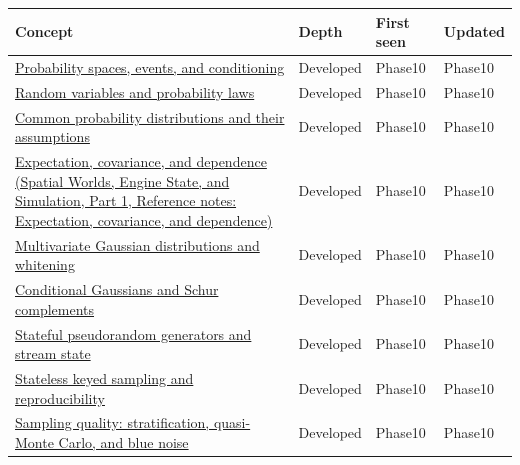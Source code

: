 {\def\LTcaptype{none} %
\begin{longtable}[]{@{}
  >{\raggedright\arraybackslash}p{}
  >{\raggedright\arraybackslash}p{}
  >{\raggedright\arraybackslash}p{}
  >{\raggedright\arraybackslash}p{}@{}}
\toprule\noalign{}
\begin{minipage}[b]{\linewidth}\raggedright
Concept
\end{minipage} & \begin{minipage}[b]{\linewidth}\raggedright
Depth
\end{minipage} & \begin{minipage}[b]{\linewidth}\raggedright
First seen
\end{minipage} & \begin{minipage}[b]{\linewidth}\raggedright
Updated
\end{minipage} \\
\midrule\noalign{}
\endhead
\bottomrule\noalign{}
\endlastfoot
\hyperref[appendix-f1ef323f6ed7]{Probability spaces, events, and conditioning} & Developed & Phase10 & Phase10 \\
\hyperref[appendix-4d0203f7944f]{Random variables and probability laws} & Developed & Phase10 & Phase10 \\
\hyperref[appendix-a2360b435383]{Common probability distributions and their assumptions} & Developed & Phase10 & Phase10 \\
\href{../05-Spatial-Worlds-Engine-State-and-Simulation-P01/main.pdf\#nameddest=appendix-54c383df9992}{Expectation, covariance, and dependence (Spatial Worlds, Engine State, and Simulation, Part 1, Reference notes: Expectation, covariance, and dependence)} & Developed & Phase10 & Phase10 \\
\hyperref[appendix-12bbe185dbe5]{Multivariate Gaussian distributions and whitening} & Developed & Phase10 & Phase10 \\
\hyperref[appendix-f0437ea55a47]{Conditional Gaussians and Schur complements} & Developed & Phase10 & Phase10 \\
\hyperref[appendix-e0f7c7e08f3a]{Stateful pseudorandom generators and stream state} & Developed & Phase10 & Phase10 \\
\hyperref[appendix-daaf25bfd3a0]{Stateless keyed sampling and reproducibility} & Developed & Phase10 & Phase10 \\
\hyperref[appendix-9f693ffd82bc]{Sampling quality: stratification, quasi-Monte Carlo, and blue noise} & Developed & Phase10 & Phase10 \\

\end{longtable}}
